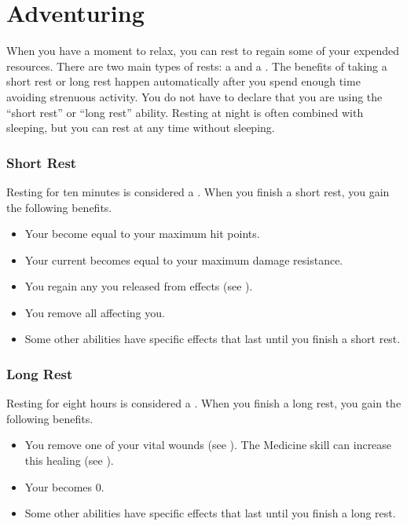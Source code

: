 \chapter{Adventuring}\label{Adventuring}


  When you have a moment to relax, you can rest to regain some of your expended resources.
  There are two main types of rests: a  and a .
  The benefits of taking a short rest or long rest happen automatically after you spend enough time avoiding strenuous activity.
  You do not have to declare that you are using the ``short rest'' or ``long rest'' ability.
  Resting at night is often combined with sleeping, but you can rest at any time without sleeping.


  \subsection{Short Rest}\label{Short Rest}
    Resting for ten minutes is considered a .
    When you finish a short rest, you gain the following benefits.
    \begin{itemize}
      \item Your  become equal to your maximum hit points.
      \item Your current  becomes equal to your maximum damage resistance.
      \item You regain any  you released from  effects (see ).
      \item You remove all  affecting you.
      \item Some other abilities have specific effects that last until you finish a short rest.
    \end{itemize}

  \subsection{Long Rest}\label{Long Rest}
    Resting for eight hours is considered a .
    When you finish a long rest, you gain the following benefits.
    \begin{itemize}
      \item You remove one of your vital wounds (see ).
        The Medicine skill can increase this healing (see ).
      \item Your  becomes 0.
      \item Some other abilities have specific effects that last until you finish a long rest.
    \end{itemize}

